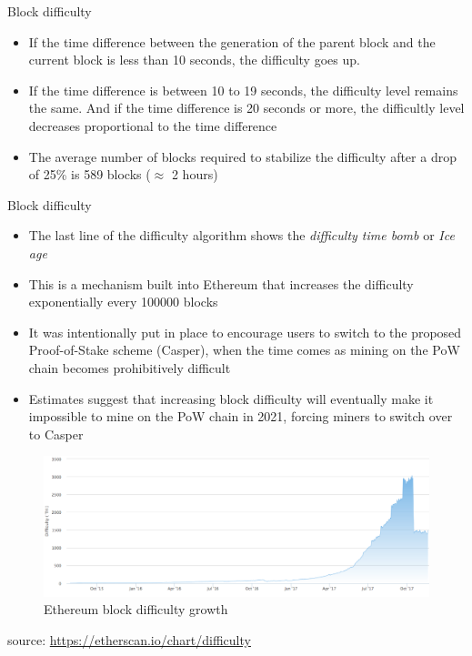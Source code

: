 \documentclass[9pt]{beamer}
\begin{document}

\begin{frame}{Block difficulty}
	\begin{itemize}
		\item If the time difference between the generation of the parent block and the current block is less than 10 seconds, the difficulty goes up.
		\item If the time difference is between 10 to 19 seconds, the difficulty level remains the same. And if the time difference is 20 seconds or more, the difficultly level decreases proportional to the time difference
		\item The average number of blocks required to stabilize the difficulty after a drop of 25\% is 589 blocks ($\approx$ 2 hours)
	\end{itemize}
\end{frame}


\begin{frame}{Block difficulty}
	\begin{itemize}
		\item The last line of the difficulty algorithm shows the \textit{difficulty time bomb} or \textit{Ice age}
		\item This is a mechanism built into Ethereum that increases the difficulty exponentially every 100000 blocks
		\item It was intentionally put in place to encourage users to switch to the proposed Proof-of-Stake scheme (Casper), when the time comes as mining on the PoW chain becomes prohibitively difficult
		\item Estimates suggest that increasing block difficulty will eventually make it impossible to mine on the PoW chain in 2021, forcing miners to switch over to Casper
	\end{itemize}
\end{frame}


\begin{frame}
	\begin{figure}[]
		\centering
		\includegraphics  [scale=0.25]{Images/eth-difficulty}
		\caption{Ethereum block difficulty growth}
	\end{figure}
	\begin{scriptsize}
		source: \href{https://etherscan.io/chart/difficulty}{https://etherscan.io/chart/difficulty}
	\end{scriptsize}
\end{frame}
\end{document}

